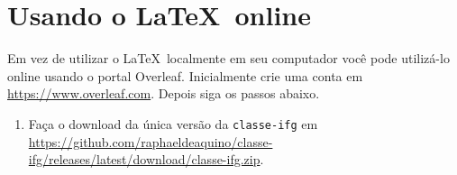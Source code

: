 \section{Usando o \LaTeX\ online}

Em vez de utilizar o \LaTeX\ localmente em seu computador você pode utilizá-lo online usando o portal Overleaf. Inicialmente crie uma conta em \url{https://www.overleaf.com}. Depois siga os passos abaixo.

\begin{enumerate}
\item Faça o download da única versão da \texttt{classe-ifg} em \url{https://github.com/raphaeldeaquino/classe-ifg/releases/latest/download/classe-ifg.zip}.
\end{enumerate}